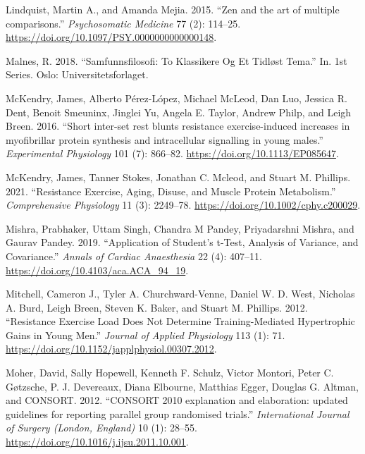 \documentclass[
  letterpaper,
  DIV=11,
  numbers=noendperiod]{scrreprt}
\newlength{\cslhangindent}
\newlength{\cslentryspacingunit} %
\newenvironment{CSLReferences}[2] %
 {%
  \setlength{\parindent}{0pt}
  \ifodd #1
  \let\oldpar\par
  \def\par{\hangindent=\cslhangindent\oldpar}
  \fi
  \setlength{\parskip}{#2\cslentryspacingunit}
 }%
 {}
\begin{document}
\begin{CSLReferences}{1}{0}
\leavevmode{}%
Lindquist, Martin A., and Amanda Mejia. 2015. {``Zen and the art of
multiple comparisons.''} \emph{Psychosomatic Medicine} 77 (2): 114--25.
\url{https://doi.org/10.1097/PSY.0000000000000148}.

\leavevmode{}%
Malnes, R. 2018. {``Samfunnsfilosofi: To Klassikere Og Et Tidløst
Tema.''} In. 1st Series. Oslo: Universitetsforlaget.

\leavevmode{}%
McKendry, James, Alberto Pérez-López, Michael McLeod, Dan Luo, Jessica
R. Dent, Benoit Smeuninx, Jinglei Yu, Angela E. Taylor, Andrew Philp,
and Leigh Breen. 2016. {``Short inter-set rest blunts resistance
exercise-induced increases in myofibrillar protein synthesis and
intracellular signalling in young males.''} \emph{Experimental
Physiology} 101 (7): 866--82. \url{https://doi.org/10.1113/EP085647}.

\leavevmode{}%
McKendry, James, Tanner Stokes, Jonathan C. Mcleod, and Stuart M.
Phillips. 2021. {``Resistance Exercise, Aging, Disuse, and Muscle
Protein Metabolism.''} \emph{Comprehensive Physiology} 11 (3): 2249--78.
\url{https://doi.org/10.1002/cphy.c200029}.

\leavevmode{}%
Mishra, Prabhaker, Uttam Singh, Chandra M Pandey, Priyadarshni Mishra,
and Gaurav Pandey. 2019. {``Application of Student's t-Test, Analysis of
Variance, and Covariance.''} \emph{Annals of Cardiac Anaesthesia} 22
(4): 407--11. \url{https://doi.org/10.4103/aca.ACA_94_19}.

\leavevmode{}%
Mitchell, Cameron J., Tyler A. Churchward-Venne, Daniel W. D. West,
Nicholas A. Burd, Leigh Breen, Steven K. Baker, and Stuart M. Phillips.
2012. {``Resistance Exercise Load Does Not Determine Training-Mediated
Hypertrophic Gains in Young Men.''} \emph{Journal of Applied Physiology}
113 (1): 71. \url{https://doi.org/10.1152/japplphysiol.00307.2012}.

\leavevmode{}%
Moher, David, Sally Hopewell, Kenneth F. Schulz, Victor Montori, Peter
C. Gøtzsche, P. J. Devereaux, Diana Elbourne, Matthias Egger, Douglas G.
Altman, and CONSORT. 2012. {``CONSORT 2010 explanation and elaboration:
updated guidelines for reporting parallel group randomised trials.''}
\emph{International Journal of Surgery (London, England)} 10 (1):
28--55. \url{https://doi.org/10.1016/j.ijsu.2011.10.001}.


\end{CSLReferences}
\end{document}
